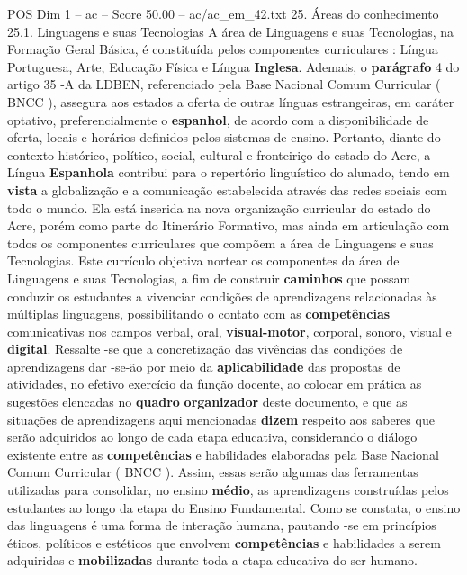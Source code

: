 \begin{textsample}{POS Dim 1 – ac – Score 50.00 – ac/ac\_em\_42.txt}  \label{ex:f1_pos_173}
25.
Áreas do conhecimento 25.1.
Linguagens e suas Tecnologias A área de Linguagens e suas Tecnologias, na Formação Geral Básica, é constituída pelos componentes curriculares : Língua Portuguesa, Arte, Educação Física e Língua \textbf{Inglesa}.
Ademais, o \textbf{parágrafo} 4 do artigo 35 -A da LDBEN, referenciado pela Base Nacional Comum Curricular ( BNCC ), assegura aos estados a oferta de outras línguas estrangeiras, em caráter optativo, preferencialmente o \textbf{espanhol}, de acordo com a disponibilidade de oferta, locais e horários definidos pelos sistemas de ensino.
Portanto, diante do contexto histórico, político, social, cultural e fronteiriço do estado do Acre, a Língua \textbf{Espanhola} contribui para o repertório linguístico do alunado, tendo em \textbf{vista} a globalização e a comunicação estabelecida através das redes sociais com todo o mundo.
Ela está inserida na nova organização curricular do estado do Acre, porém como parte do Itinerário Formativo, mas ainda em articulação com todos os componentes curriculares que compõem a área de Linguagens e suas Tecnologias.
Este currículo objetiva nortear os componentes da área de Linguagens e suas Tecnologias, a fim de construir \textbf{caminhos} que possam conduzir os estudantes a vivenciar condições de aprendizagens relacionadas às múltiplas linguagens, possibilitando o contato com as \textbf{competências} comunicativas nos campos verbal, oral, \textbf{visual-motor}, corporal, sonoro, visual e \textbf{digital}.
Ressalte -se que a concretização das vivências das condições de aprendizagens dar -se-ão por meio da \textbf{aplicabilidade} das propostas de atividades, no efetivo exercício da função docente, ao colocar em prática as sugestões elencadas no \textbf{quadro} \textbf{organizador} deste documento, e que as situações de aprendizagens aqui mencionadas \textbf{dizem} respeito aos saberes que serão adquiridos ao longo de cada etapa educativa, considerando o diálogo existente entre as \textbf{competências} e habilidades elaboradas pela Base Nacional Comum Curricular ( BNCC ).
Assim, essas serão algumas das ferramentas utilizadas para consolidar, no ensino \textbf{médio}, as aprendizagens construídas pelos estudantes ao longo da etapa do Ensino Fundamental.
Como se constata, o ensino das linguagens é uma forma de interação humana, pautando -se em princípios éticos, políticos e estéticos que envolvem \textbf{competências} e habilidades a serem adquiridas e \textbf{mobilizadas} durante toda a etapa educativa do ser humano.

\end{textsample}
